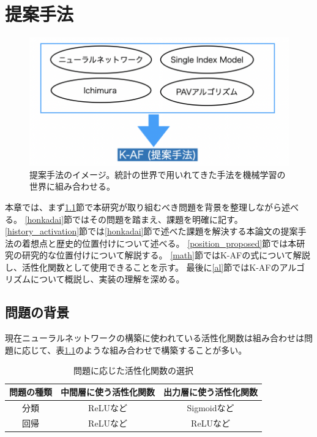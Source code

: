 \chapter{提案手法}
\label{proposed}



\begin{figure}[hbtp]
\includegraphics[width=15cm]{asset/proposed_method.png}
	\caption{提案手法のイメージ。統計の世界で用いれてきた手法を機械学習の世界に組み合わせる。}
	\label{proposed_method}
\end{figure}

本章では、まず\ref{mondai}節で本研究が取り組むべき問題を背景を整理しながら述べる。
\ref{honkadai}節ではその問題を踏まえ、課題を明確に記す。
\ref{history_activation}節では\ref{honkadai}節で述べた課題を解決する本論文の提案手法の着想点と歴史的位置付けについて述べる。
\ref{position_proposed}節では本研究の研究的な位置付けについて解説する。
\ref{math}節ではK-AFの式について解説し、活性化関数として使用できることを示す。
最後に\ref{al}節ではK-AFのアルゴリズムについて概説し、実装の理解を深める。




\section{問題の背景}
\label {mondai}


現在ニューラルネットワークの構築に使われている活性化関数は組み合わせは問題に応じて、表\ref{which_to_use}のような組み合わせで構築することが多い。

\begin{table}[htbp]
\label{exp:iris}
    \begin{center}
        \caption{問題に応じた活性化関数の選択}
        \label{which_to_use}
        \vspace{2mm} 
        \begin{tabular}{ |c|c|c| }
        \hline
        問題の種類 & 中間層に使う活性化関数 & 出力層に使う活性化関数\\
        \hline
        分類  & ReLUなど & Sigmoidなど \\
        \hline
        回帰  & ReLUなど & ReLUなど \\
        \hline
        \end{tabular}
    \end{center}
\end{table}

